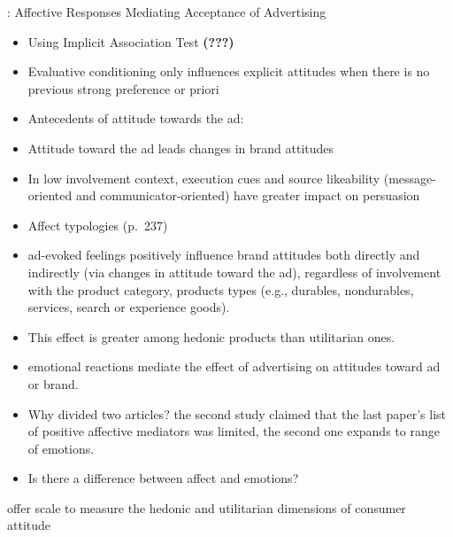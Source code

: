 \documentclass[
]{book}
\begin{document}
\citep{gibson2008}: Affective Responses Mediating Acceptance of Advertising

\begin{itemize}
\item
  Using Implicit Association Test \textbf{(???)}
\item
  Evaluative conditioning only influences explicit attitudes when there is no previous strong preference or priori
\end{itemize}

\citet{batra1986a}

\begin{itemize}
\item
  Antecedents of attitude towards the ad:
\item
  Attitude toward the ad leads changes in brand attitudes \citep{mackenzie1986, mitchell1981}
\item
  In low involvement context, execution cues and source likeability (message-oriented and communicator-oriented) have greater impact on persuasion
\item
  Affect typologies (p.~237)
\end{itemize}

\citet{pham2013}

\begin{itemize}
\item
  ad-evoked feelings positively influence brand attitudes both directly and indirectly (via changes in attitude toward the ad), regardless of involvement with the product category, products types (e.g., durables, nondurables, services, search or experience goods).
\item
  This effect is greater among hedonic products than utilitarian ones.
\end{itemize}

\citet{holbrook1987}

\begin{itemize}
\item
  emotional reactions mediate the effect of advertising on attitudes toward ad or brand.
\item
  Why divided two articles? the second study claimed that the last paper's list of positive affective mediators was limited, the second one expands to range of emotions.
\item
  Is there a difference between affect and emotions?
\end{itemize}

\citep{batra1991, voss2003} offer scale to measure the hedonic and utilitarian dimensions of consumer attitude
\end{document}

